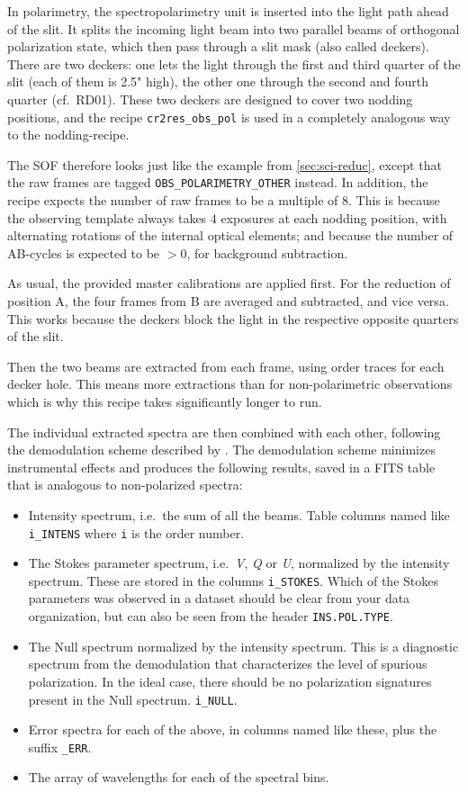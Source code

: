 In polarimetry, the spectropolarimetry unit is inserted into the light path
ahead of the slit. It splits the incoming light beam into two parallel beams
of orthogonal polarization state, which then pass through a slit mask (also 
called deckers). There are two deckers: one lets the light through the first
and third quarter of the slit (each of them is 2.5" high), the other one
through the second and fourth quarter (cf.~RD01\cite{CIRESMAN}).
These two deckers are designed to cover two nodding positions, and the recipe
\verb!cr2res_obs_pol! is used in a completely analogous way to the nodding-recipe.

The SOF therefore looks just like the example from \ref{sec:sci-reduc}, except
that the raw frames are tagged \linebreak\verb!OBS_POLARIMETRY_OTHER! instead.
In addition, the recipe expects the number of raw frames to be a multiple of
$8$. This is because the observing template always takes $4$ exposures at each
nodding position, with alternating rotations of the internal optical elements;
and because the number of AB-cycles is expected to be $>0$, for background
subtraction.

As usual, the provided master calibrations are applied first. 
For the reduction of position A, the four frames from B are averaged and
subtracted, and vice versa. This works because the deckers block the light in
the respective opposite quarters of the slit.

Then the two beams are extracted from each frame, using order traces for each
decker hole. This means more extractions than for non-polarimetric observations
which is why this recipe takes significantly longer to run.

The individual extracted spectra are then combined with each other, following
the demodulation scheme described by \cite{1997MNRAS.291..658D}. The
demodulation scheme minimizes instrumental effects and produces the following
results, saved in a FITS table that is analogous to non-polarized spectra:

\begin{itemize}
    \item Intensity spectrum, i.e.~the sum of all the beams. Table columns named like \verb!i_INTENS! where \verb!i! is the order number.
    \item The Stokes parameter spectrum, i.e.~\textit{V}, \textit{Q} or \textit{U}, normalized by the intensity spectrum. These are stored in the columns \verb!i_STOKES!. Which of the Stokes parameters was observed in a dataset should be clear from your data organization, but can also be seen from the header \verb!INS.POL.TYPE!.
    \item The Null spectrum normalized by the intensity spectrum. This is a diagnostic spectrum from the demodulation that characterizes the level of spurious polarization. In the ideal case, there should be no polarization signatures present in the Null spectrum. \verb!i_NULL!.
    \item Error spectra for each of the above, in columns named like these, plus the suffix \verb!_ERR!.
    \item The array of wavelengths for each of the spectral bins.
\end{itemize}

